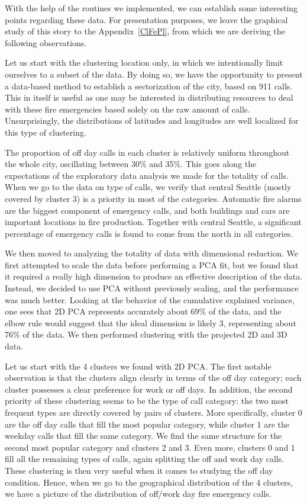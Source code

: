 \documentclass[12pt,a4paper]{article}
\begin{document}
With the help of the routines we implemented, we can establish some interesting points regarding these data. For presentation purposes, we leave the graphical study of this story to the Appendix~\ref{ClFePl}, from which we are deriving the following observations.

Let us start with the clustering location only, in which we intentionally limit ourselves to a subset of the data. By doing so, we have the opportunity to present a data-based method to establish a sectorization of the city, based on 911 calls. This in itself is useful as one may be interested in distributing resources to deal with these fire emergencies based solely on the raw amount of calls. Unsurprisingly, the distributions of latitudes and longitudes are well localized for this type of clustering.

The proportion of off day calls in each cluster is relatively uniform throughout the whole city, oscillating between 30\% and 35\%. This goes along the expectations of the exploratory data analysis we made for the totality of calls. When we go to the data on type of calls, we verify that central Seattle (mostly covered by cluster 3) is a priority in most of the categories. Automatic fire alarms are the biggest component of emergency calls, and both buildings and cars are important locations in fire production. Together with central Seattle, a significant percentage of emergency calls is found to come from the north in all categories.

We then moved to analyzing the totality of data with dimensional reduction. We first attempted to scale the data before performing a PCA fit, but we found that it required a really high dimension to produce an effective description of the data. Instead, we decided to use PCA without previously scaling, and the performance was much better. Looking at the behavior of the cumulative explained variance, one sees that 2D PCA represents accurately about 69\% of the data, and the elbow rule would suggest that the ideal dimension is likely 3, representing about 76\% of the data. We then performed clustering with the projected 2D and 3D data.

Let us start with the 4 clusters we found with 2D PCA. The first notable observation is that the clusters align clearly in terms of the off day category; each cluster possesses a clear preference for work or off days. In addition, the second priority of these clustering seems to be the type of call category: the two most frequent types are directly covered by pairs of clusters. More specifically, cluster 0 are the off day calls that fill the most popular category, while cluster 1 are the weekday calls that fill the same category. We find the same structure for the second most popular category and clusters 2 and 3. Even more, clusters 0 and 1 fill all the remaining types of calls, again splitting the off and work day calls. These clustering is then very useful when it comes to studying the off day condition. Hence, when we go to the geographical distribution of the 4 clusters, we have a picture of the distribution of off/work day fire emergency calls.
\end{document}
